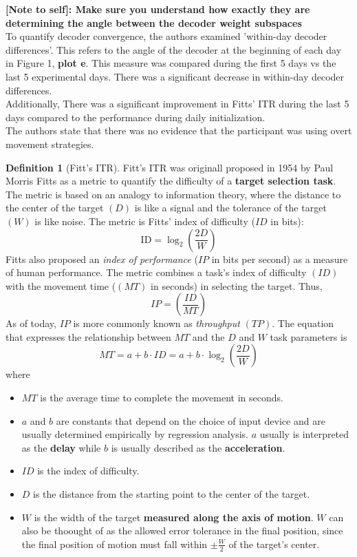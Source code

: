 \documentclass[11pt, a4paper, openany]{report}
\theoremstyle{definition}
\newtheorem{defn}{Definition}
\theoremstyle{remark}
\begin{document}
\textbf{[Note to self]: Make sure you understand how exactly they are determining the angle between the decoder weight subspaces}\\

To quantify decoder convergence, the authors examined 'within-day decoder differences'. This refers to the angle of the decoder at the beginning of each day in Figure 1, \textbf{plot e}. This measure was compared during the first 5 days vs the last 5 experimental days. There was a significant decrease in within-day decoder differences.\\

Additionally, There was a significant improvement in Fitts' ITR during the last 5 days compared to the performance during daily initialization.\\

The authors state that there was no evidence that the participant was using overt movement strategies. 

\begin{defn}[Fitt's ITR]
    Fitt's ITR was originall proposed in 1954 by Paul Morris Fitts as a metric to quantify the difficulty of a \textbf{target selection task}. The metric is based on an analogy to information theory, where
    the distance to the center of the target \( (D) \) is like a signal and the tolerance of the target \( (W) \) is like noise.
    The metric is Fitts' index of difficulty (\( ID \) in bits):
    \[ \mathrm{ID} = \log_2 \left( \frac{2D}{W} \right) \]
    Fitts also proposed an \textit{index of performance} (\( IP \) in bits per second) as a measure of human performance. The metric combines a task's index of difficulty \( (ID) \) with the movement time (\( (MT) \) in seconds) in selecting the target. Thus,
    \[ IP = \left( \frac{ID}{MT} \right) \]
    As of today, \( IP \) is more commonly known as \textit{throughput} \( (TP) \).
    The equation that expresses the relationship between \( MT \) and the \( D \) and \( W \) task parameters is
    \[ MT = a + b \cdot ID = a + b \cdot \log_2 \left( \frac{2D}{W} \right) \] where
    \begin{itemize}
        \item \( MT \) is the average time to complete the movement in seconds.
        \item \( a \) and \( b \) are constants that depend on the choice of input device and are usually determined empirically by regression analysis. \( a \) usually is interpreted as the \textbf{delay} while \( b \) is usually described as the \textbf{acceleration}.
        \item \( ID \) is the index of difficulty.
        \item \( D \) is the distance from the starting point to the center of the target.
        \item \( W \) is the width of the target \textbf{measured along the axis of motion}. \( W \) can also be thoought of as the allowed error tolerance in the final position, since the final position of motion must fall within \( \pm \frac{W}{2} \) of the target's center.
    \end{itemize}
\end{defn}
\end{document}
